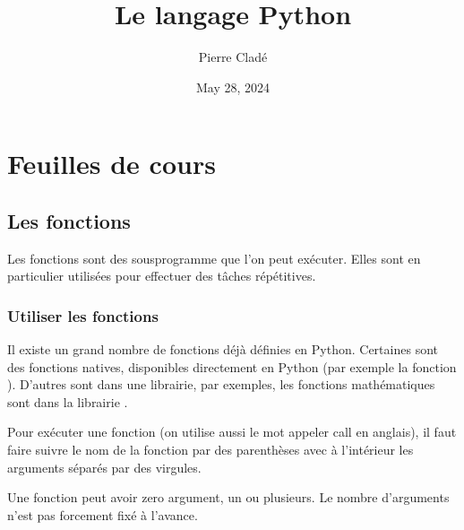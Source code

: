 \documentclass[letterpaper,10pt,english]{sphinxhowto}
\title{Le langage Python}
\date{May 28, 2024}
\author{Pierre Cladé}
\begin{document}
\pagestyle{empty}
\sphinxmaketitle
\pagestyle{plain}

\pagestyle{normal}
\label{\detokenize{index::doc}}



\section{Feuilles de cours}
\label{\detokenize{feuilles_de_cours:feuilles-de-cours}}\label{\detokenize{feuilles_de_cours::doc}}

\subsection{Les fonctions}
\label{\detokenize{cours1_fonctions_cours:les-fonctions}}\label{\detokenize{cours1_fonctions_cours::doc}}
\sphinxAtStartPar
Les fonctions sont des sous\sphinxhyphen{}programme que l’on peut exécuter. Elles sont en particulier utilisées pour effectuer des tâches répétitives.


\subsubsection{Utiliser les fonctions}
\label{\detokenize{cours1_fonctions_cours:utiliser-les-fonctions}}
\sphinxAtStartPar
Il existe un grand nombre de fonctions déjà définies en Python. Certaines sont des fonctions natives, disponibles directement en Python (par exemple la fonction ). D’autres sont dans une librairie, par exemples, les fonctions mathématiques sont dans la librairie .

\sphinxAtStartPar
Pour exécuter une fonction (on utilise aussi le mot appeler \sphinxhyphen{} call en anglais), il faut faire suivre le nom de la fonction par des parenthèses avec à l’intérieur les arguments séparés par des virgules.

\sphinxAtStartPar
Une fonction peut avoir zero argument, un ou plusieurs. Le nombre d’arguments n’est pas forcement fixé à l’avance.

\begin{sphinxVerbatim}[commandchars=\\\{\}]
 

    
 

  
\end{sphinxVerbatim}
\end{document}
